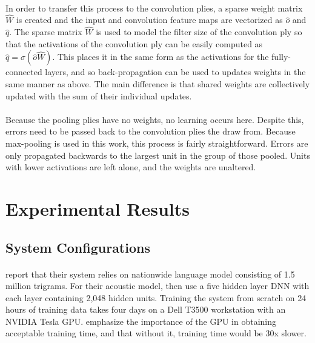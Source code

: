 \documentclass[letterpaper]{article}
\begin{document}
\paragraph{} In order to transfer this process to the convolution plies, a sparse weight matrix $\hat{W}$ is created and the input and convolution feature maps are vectorized as $\hat{o}$ and $\hat{q}$. The sparse matrix $\hat{W}$ is used to model the filter size of the convolution ply so that the activations of the convolution ply can be easily computed as $\hat{q} = \sigma (\hat{o}\hat{W})$. This places it in the same form as the activations for the fully-connected layers, and so back-propagation can be used to updates weights in the same manner as above. The main difference is that shared weights are collectively updated with the sum of their individual updates.

\paragraph{} Because the pooling plies have no weights, no learning occurs here. Despite this, errors need to be passed back to the convolution plies the draw from. Because max-pooling is used in this work, this process is fairly straightforward. Errors are only propagated backwards to the largest unit in the group of those pooled. Units with lower activations are left alone, and the weights are unaltered.

\section*{Experimental Results} 

\subsection*{System Configurations}

\paragraph{} \cite{DBLP:journals/taslp/DahlYDA12} report that their system relies on nationwide language model consisting of 1.5 million trigrams. For their acoustic model, then use a five hidden layer DNN with each layer containing 2,048 hidden units. Training the system from scratch on 24 hours of training data takes four days on a Dell T3500 workstation with an NVIDIA Tesla GPU. \cite{DBLP:journals/taslp/DahlYDA12} emphasize the importance of the GPU in obtaining acceptable training time, and that without it, training time would be 30x slower.
\end{document}
